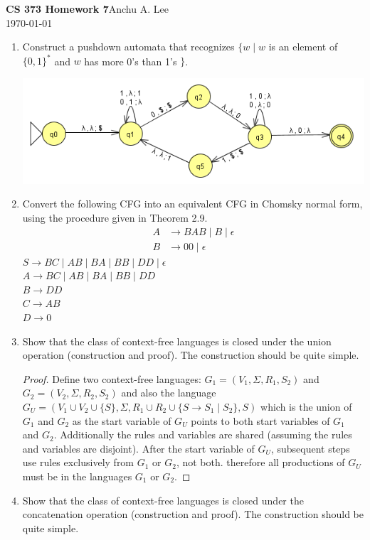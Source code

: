 \documentclass{article}
\begin{document}
    \noindent\textbf{CS 373 Homework 7}\hfill Anchu A. Lee\\
    \noindent\today\\
    \begin{enumerate}
        \item Construct a pushdown automata that recognizes $\{w \mid w $ is an element of $ \{0,1\}^* $ and $w$ has more 0's than 1's $ \}$.\\
        \begin{center}
            \includegraphics[scale=0.6]{machine1}
        \end{center}

        \item Convert the following CFG into an equivalent CFG in Chomsky normal form, using the procedure given in Theorem 2.9.
            \begin{align*}
                A&\rightarrow BAB\mid B\mid \epsilon\\
                B&\rightarrow 00 \mid \epsilon
            \end{align*}
            $S\rightarrow BC \mid AB \mid BA \mid BB \mid DD \mid \epsilon$\\
            $A\rightarrow BC\mid AB \mid BA \mid BB \mid DD$\\
            $B\rightarrow DD$\\
            $C\rightarrow AB$\\
            $D\rightarrow 0$
        \item Show that the class of context-free languages is closed under the union operation (construction and proof). The construction should be quite simple.
            \begin{proof}
                Define two context-free languages: $G_1=(V_1, \Sigma, R_1, S_2)$ and $G_2=(V_2, \Sigma, R_2, S_2)$ and also the language $G_U = (V_1\cup V_2\cup \{S\},\Sigma, R_1\cup R_2\cup \{S\rightarrow S_1 \mid S_2\}, S )$ which is the union of $G_1$ and $G_2$ as the start variable of $G_U$ points to both start variables of $G_1$ and $G_2$. Additionally the rules and variables are shared (assuming the rules and variables are disjoint). After the start variable of $G_U$, subsequent steps use rules exclusively from $G_1$ or $G_2$, not both. therefore all productions of $G_U$ must be in the languages $G_1$ or $G_2$.
            \end{proof}
        \item Show that the class of context-free languages is closed under the concatenation operation (construction and proof). The construction should be quite simple.


\end{enumerate}
\end{document}
